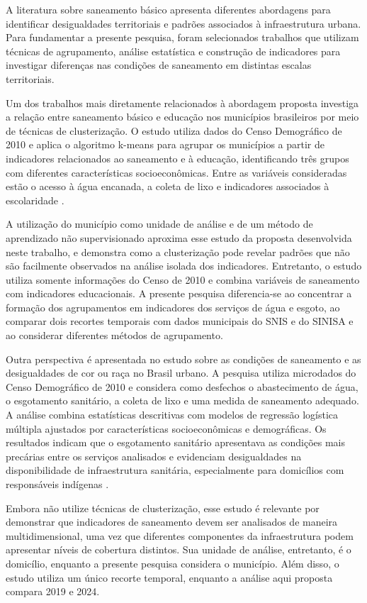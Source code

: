 \documentclass[12pt]{article}
\begin{document}
A literatura sobre saneamento básico apresenta diferentes abordagens para identificar desigualdades
territoriais e padrões associados à infraestrutura urbana. Para fundamentar a presente pesquisa,
foram selecionados trabalhos que utilizam técnicas de agrupamento, análise estatística e construção
de indicadores para investigar diferenças nas condições de saneamento em distintas escalas
territoriais.

Um dos trabalhos mais diretamente relacionados à abordagem proposta investiga a relação entre
saneamento básico e educação nos municípios brasileiros por meio de técnicas de clusterização. O
estudo utiliza dados do Censo Demográfico de 2010 e aplica o algoritmo k-means para agrupar os
municípios a partir de indicadores relacionados ao saneamento e à educação, identificando três grupos
com diferentes características socioeconômicas. Entre as variáveis consideradas estão o acesso à
água encanada, a coleta de lixo e indicadores associados à escolaridade \cite{lima2025}.

A utilização do município como unidade de análise e de um método de aprendizado não supervisionado
aproxima esse estudo da proposta desenvolvida neste trabalho, e demonstra como a clusterização pode
revelar padrões que não são facilmente observados na análise isolada dos indicadores. Entretanto, o
estudo utiliza somente informações do Censo de 2010 e combina variáveis de saneamento com
indicadores educacionais. A presente pesquisa diferencia-se ao concentrar a formação dos
agrupamentos em indicadores dos serviços de água e esgoto, ao comparar dois recortes temporais com
dados municipais do SNIS e do SINISA e ao considerar diferentes métodos de agrupamento.

Outra perspectiva é apresentada no estudo sobre as condições de saneamento e as desigualdades de cor
ou raça no Brasil urbano. A pesquisa utiliza microdados do Censo Demográfico de 2010 e considera como
desfechos o abastecimento de água, o esgotamento sanitário, a coleta de lixo e uma medida de
saneamento adequado. A análise combina estatísticas descritivas com modelos de regressão logística
múltipla ajustados por características socioeconômicas e demográficas. Os resultados indicam que o
esgotamento sanitário apresentava as condições mais precárias entre os serviços analisados e
evidenciam desigualdades na disponibilidade de infraestrutura sanitária, especialmente para
domicílios com responsáveis indígenas \cite{raupp2017}.

Embora não utilize técnicas de clusterização, esse estudo é relevante por demonstrar que indicadores
de saneamento devem ser analisados de maneira multidimensional, uma vez que diferentes componentes da
infraestrutura podem apresentar níveis de cobertura distintos. Sua unidade de análise, entretanto, é
o domicílio, enquanto a presente pesquisa considera o município. Além disso, o estudo utiliza um único
recorte temporal, enquanto a análise aqui proposta compara 2019 e 2024.
\end{document}
